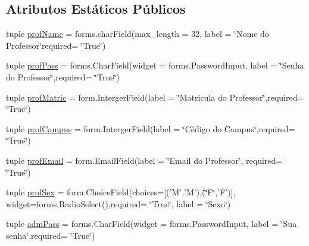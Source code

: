 \subsection*{Atributos Estáticos Públicos}
\begin{DoxyCompactItemize}
\item 
tuple \hyperlink{classAdm_1_1forms_1_1AdmRegProfForm_aec9f5746e7eb7f389c0f159780dd71fa}{prof\-Name} = forms.\-char\-Field(max\-\_\-length = 32, label = \char`\"{}Nome do Professor\char`\"{}required= \char`\"{}True\char`\"{})
\item 
tuple \hyperlink{classAdm_1_1forms_1_1AdmRegProfForm_afe9e2e7368001ac81851ece8b42ccb57}{prof\-Pass} = forms.\-Char\-Field(widget = forms.\-Password\-Input, label = \char`\"{}Senha do Professor\char`\"{},required= \char`\"{}True\char`\"{})
\item 
tuple \hyperlink{classAdm_1_1forms_1_1AdmRegProfForm_ac53b20321fbc980c896f534229c68ff1}{prof\-Matric} = form.\-Interger\-Field(label = \char`\"{}Matricula do Professor\char`\"{},required= \char`\"{}True\char`\"{})
\item 
tuple \hyperlink{classAdm_1_1forms_1_1AdmRegProfForm_a0c90beb927b61260feb194030798db38}{prof\-Campus} = form.\-Interger\-Field(label = \char`\"{}Cédigo do Campus\char`\"{},required= \char`\"{}True\char`\"{})
\item 
tuple \hyperlink{classAdm_1_1forms_1_1AdmRegProfForm_a56c1eca35253b136bf8886135c9633b0}{prof\-Email} = form.\-Email\-Field(label = \char`\"{}Email do Professor\char`\"{}, required= \char`\"{}True\char`\"{})
\item 
tuple \hyperlink{classAdm_1_1forms_1_1AdmRegProfForm_ab910e0448e7d6dac759c1cdcb24a4314}{prof\-Sex} = form.\-Choice\-Field(choices=\mbox{[}('M','M'),(\char`\"{}F\char`\"{},'F')\mbox{]}, widget=forms.\-Radio\-Select(),required= \char`\"{}True\char`\"{}, label = \char`\"{}Sexo\char`\"{})
\item 
tuple \hyperlink{classAdm_1_1forms_1_1AdmRegProfForm_aa9a564546d369e53f8512a473669b78d}{adm\-Pass} = forms.\-Char\-Field(widget = forms.\-Password\-Input, label = \char`\"{}Sua senha\char`\"{},required= \char`\"{}True\char`\"{})
\end{DoxyCompactItemize}


